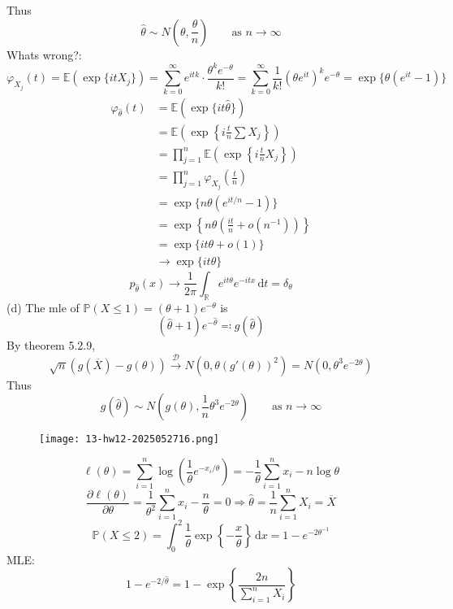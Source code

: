 Thus
\[
\widehat{\theta}\sim N\left( \theta,\frac{\theta}{n} \right)\qquad \text{as }n\to \infty
\]
Whats wrong?:
\[
\varphi_{X_j}(t)=\mathbb{E}(\exp \{ itX_j \})=\sum_{k=0}^{\infty} e^{ itk }\cdot\frac{\theta^{k}e^{ -\theta }}{k!}=\sum_{k=0}^{\infty} \frac{1}{k!}(\theta e^{ it })^{k}e^{ -\theta }=\exp \{ \theta(e^{ it }-1) \}
\]
\[
\begin{aligned}
\varphi_{\widehat{\theta}}(t) & =\mathbb{E}(\exp \{ it\widehat{\theta} \}) \\
 & =\mathbb{E}\left( \exp \left\{  i\frac{t}{n}\sum X_j  \right\} \right) \\
 & =\prod_{j=1}^{n} \mathbb{E}\left( \exp \left\{  i\frac{t}{n}X_j  \right\} \right) \\
 & =\prod_{j=1}^{n}\varphi_{X_j}\left( \frac{t}{n} \right)  \\
 & =\exp \{ n\theta(e^{ it/n  }-1) \} \\
 & =\exp \left\{  n\theta\left( \frac{it}{n}+o(n^{-1}) \right)  \right\} \\
 & =\exp \{ it\theta+o(1) \} \\
 & \to \exp \{ it\theta \}
\end{aligned}
\]
\[
p_{\widehat{\theta}}(x)\to\frac{1}{2\pi}\int_{\mathbb{R}}^{} e^{ it\theta }e^{ -itx } \, \mathrm{d}t=\delta_{\theta} 
\]
(d)
The mle of $\mathbb{P}(X\leq1)=(\theta+1)e^{ -\theta }$ is
\[
(\widehat{\theta}+1)e^{ -\widehat{\theta} }\eqqcolon g(\widehat{\theta})
\]
By theorem 5.2.9,
\[
\sqrt{ n }(g(\overline{X})-g(\theta))\overset{ \mathcal{D} }{ \to }N(0,\theta(g'(\theta))^2)=N(0,\theta^{3}e^{ -2\theta })
\]
Thus
\[
g(\widehat{\theta})\sim N\left( g(\theta),\frac{1}{n}\theta^{3}e^{ -2\theta } \right)\qquad \text{as }n\to \infty
\]
\begin{exercise}
\begin{figure}[H]
\centering
\texttt{[image: 13-hw12-2025052716.png]}
\label{}
\end{figure}
\end{exercise}
\[
\ell(\theta)=\sum_{i=1}^{n} \log\left( \frac{1}{\theta}e^{ -x_i/\theta } \right)=-\frac{1}{\theta}\sum_{i=1}^{n} x_i-n\log\theta
\]
\[
\frac{ \partial  \ell(\theta) }{ \partial \theta } =\frac{1}{\theta^{2}}\sum_{i=1}^{n} x_i-\frac{n}{\theta}=0\Rightarrow\widehat{\theta}=\frac{1}{n}\sum_{i=1}^{n} X_i=\overline{X}
\]
\[
\mathbb{P}(X\leq 2)=\int_{0}^{2} \frac{1}{\theta}\exp \left\{  -\frac{x}{\theta}  \right\} \, \mathrm{d}x =1-e^{ -2\theta ^{-1} }
\]
MLE:
\[
1-e^{ -2/\widehat{\theta} }=1-\exp \left\{  \frac{2n}{\sum_{i=1}^{n} X_i}  \right\}
\]
